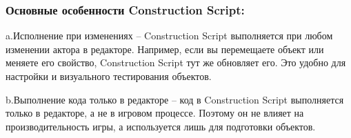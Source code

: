 \subsubsection*{Основные особенности Construction Script:}

a.\hspace{1em}Исполнение при изменениях – Construction Script выполняется при 
любом изменении актора в редакторе. Например, если вы перемещаете объект или 
меняете его свойство, Construction Script тут же обновляет его. Это удобно для 
настройки и визуального тестирования объектов.

b.\hspace{1em}Выполнение кода только в редакторе – код в Construction Script 
выполняется только в редакторе, а не в игровом процессе. Поэтому он не влияет на 
производительность игры, а используется лишь для подготовки объектов.